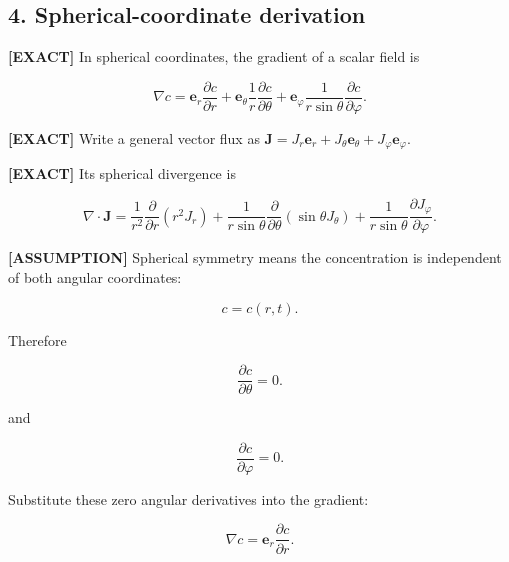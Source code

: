 \documentclass[11pt,a4paper]{article}
\begin{document}
\subsection*{4. Spherical-coordinate derivation}

\textbf{[EXACT]} In spherical coordinates, the gradient of a scalar field is

\begin{equation}
\nabla c=\mathbf e_r\frac{\partial c}{\partial r}+\mathbf e_\theta\frac1r\frac{\partial c}{\partial\theta}+\mathbf e_\varphi\frac1{r\sin\theta}\frac{\partial c}{\partial\varphi}.
\tag{TRISO-SPH-020}
\label{eq:triso-sph-020}
\end{equation}

\textbf{[EXACT]} Write a general vector flux as $\mathbf J=J_r\mathbf e_r+J_\theta\mathbf e_\theta+J_\varphi\mathbf e_\varphi$.

\textbf{[EXACT]} Its spherical divergence is

\begin{equation}
\nabla\cdot\mathbf J=\frac1{r^2}\frac{\partial}{\partial r}(r^2J_r)+\frac1{r\sin\theta}\frac{\partial}{\partial\theta}(\sin\theta J_\theta)+\frac1{r\sin\theta}\frac{\partial J_\varphi}{\partial\varphi}.
\tag{TRISO-SPH-021}
\label{eq:triso-sph-021}
\end{equation}

\textbf{[ASSUMPTION]} Spherical symmetry means the concentration is independent of both angular coordinates:

\begin{equation}
c=c(r,t).
\tag{TRISO-SPH-022}
\label{eq:triso-sph-022}
\end{equation}

Therefore

\begin{equation}
\frac{\partial c}{\partial\theta}=0.
\tag{TRISO-SPH-023}
\label{eq:triso-sph-023}
\end{equation}

and

\begin{equation}
\frac{\partial c}{\partial\varphi}=0.
\tag{TRISO-SPH-024}
\label{eq:triso-sph-024}
\end{equation}

Substitute these zero angular derivatives into the gradient:

\begin{equation}
\nabla c=\mathbf e_r\frac{\partial c}{\partial r}.
\tag{TRISO-SPH-025}
\label{eq:triso-sph-025}
\end{equation}
\end{document}
